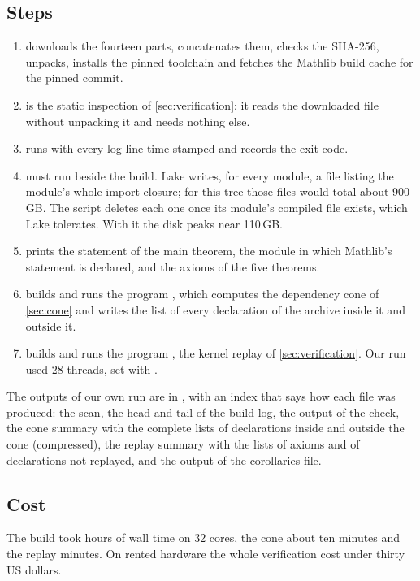 \subsection*{Steps}
\begin{enumerate}
\item {} downloads the fourteen parts, concatenates them, checks the SHA-256,
  unpacks, installs the pinned toolchain and fetches the Mathlib build cache for the pinned
  commit.
\item {} is the static inspection of \cref{sec:verification}: it reads the
  downloaded file without unpacking it and needs nothing else.
\item {} runs  with every log line time-stamped and records
  the exit code.
\item {} must run beside the build. Lake writes, for every module, a file listing
  the module's whole import closure; for this tree those files would total about 900\,GB. The
  script deletes each one once its module's compiled file exists, which Lake tolerates. With it
  the disk peaks near 110\,GB.
\item {} prints the statement of the main theorem, the module in which Mathlib's
  statement is declared, and the axioms of the five theorems.
\item {} builds and runs the program , which computes the
  dependency cone of \cref{sec:cone} and writes the list of every declaration of the archive
  inside it and outside it.
\item {} builds and runs the program , the kernel
  replay of \cref{sec:verification}. Our run used 28 threads, set with
  .
\end{enumerate}
The outputs of our own run are in , with an index that says how each
file was produced: the scan, the head and tail of the build log, the output of the check, the
cone summary with the complete lists of declarations inside and outside the cone (compressed),
the replay summary with the lists of axioms and of declarations not replayed, and the output
of the corollaries file.

\subsection*{Cost}
The build took \buildhours{} hours of wall time on 32 cores, the cone about ten minutes and the
replay \replayminutes{} minutes. On rented hardware the whole verification cost under thirty US
dollars.
